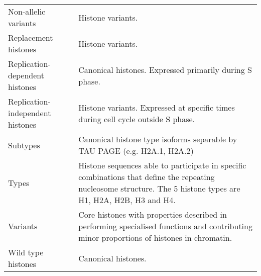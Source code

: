 \begin{table*}[hp]
\begin{tabular}{F p{\dimexpr(\textwidth--4\tabcolsep)}}
	  \\
      \addlinespace
	  Non-allelic variants &
	  Histone variants. \\
      \addlinespace
      Replacement histones &
	  Histone variants. \\
      \addlinespace
	  Replication-dependent histones &
	  Canonical histones. Expressed primarily during S phase. \\
      \addlinespace
	  Replication-independent histones &
	  Histone variants. Expressed at specific times during cell cycle outside S phase. \\
      \addlinespace
	  Subtypes &
	  Canonical histone type isoforms separable by TAU PAGE 
	  (e.g. H2A.1, H2A.2)
	  \\
      \addlinespace
	  Types &
	  Histone sequences able to participate in specific combinations 
	  that define the repeating nucleosome structure. 
	  The 5 histone types are H1, H2A, H2B, H3 and H4.
	  \\
      \addlinespace
	  Variants &
	  Core histones with properties described in  
	  performing specialised functions and contributing minor proportions of histones in chromatin. \\
      \addlinespace
	  Wild type histones &
	  Canonical histones. \\
      \bottomrule
    \end{tabular}
  \end{table*}
